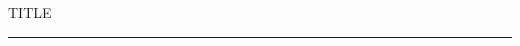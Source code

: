\documentclass[11pt,a4paper]{article}
\begin{document}
{\small\sffamily\color{teal} {{TITLE}}}\par\hrule\medskip

\end{document}
